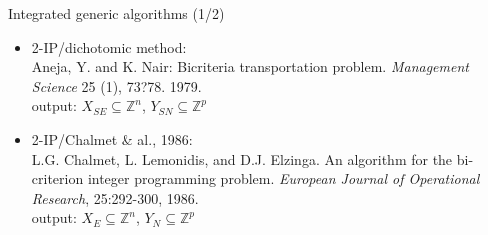 \documentclass[10pt,xcolor=dvipsnames]{beamer}
\newcommand{\grey}{\textcolor{black!25}}
\newcommand{\R}{\mathbb{R}}%
\newcommand{\Z}{\mathbb{Z}}
\begin{document}
\begin{frame}{Integrated generic algorithms (1/2)}
{\begin{itemize}
\item \grey{
         2-IP/dichotomic method:\vspace{1mm}\\   
         {\tiny Aneja, Y. and K. Nair:
          Bicriteria transportation problem. 
          \textit{Management Science} 25 (1), 73?78. 1979.\\}
         output: $X_{SE} \subseteq \Z^n$, $Y_{SN} \subseteq \Z^p$
         }
         \medskip
\item \grey{
         2-IP/Chalmet \& al., 1986:\vspace{1mm}\\   
         {\tiny L.G. Chalmet, L. Lemonidis, and D.J. Elzinga. An algorithm for the bi-criterion integer programming problem. 
         \textit{European Journal of Operational Research}, 25:292-300, 1986.\\}
         output: $X_E \subseteq \Z^n$, $Y_N \subseteq \Z^p$
         }         
%         
\end{itemize}
}
\end{frame}
\end{document}
